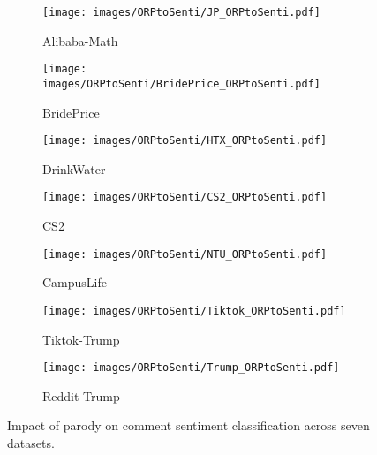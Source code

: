 \begin{figure}[htbp]
  \centering
  \begin{subfigure}[b]{0.23\textwidth}
    \centering
    \texttt{[image: images/ORPtoSenti/JP\_ORPtoSenti.pdf]}
    \caption{Alibaba-Math}
    \label{fig:ORPtoSenti_sub1}
  \end{subfigure}
  \begin{subfigure}[b]{0.23\textwidth}
    \centering
    \texttt{[image: images/ORPtoSenti/BridePrice\_ORPtoSenti.pdf]}
    \caption{BridePrice}
    \label{fig:ORPtoSenti_sub2}
  \end{subfigure}

  \vspace{0.7cm}
  
  \begin{subfigure}[b]{0.23\textwidth}
    \centering
    \texttt{[image: images/ORPtoSenti/HTX\_ORPtoSenti.pdf]}
    \caption{DrinkWater}
    \label{fig:ORPtoSenti_sub3}
  \end{subfigure} 
  \begin{subfigure}[b]{0.23\textwidth}
    \centering
    \texttt{[image: images/ORPtoSenti/CS2\_ORPtoSenti.pdf]}
    \caption{CS2}
    \label{fig:ORPtoSenti_sub4}
  \end{subfigure}

  \vspace{0.7cm}

  \begin{subfigure}[b]{0.23\textwidth}
    \centering
    \texttt{[image: images/ORPtoSenti/NTU\_ORPtoSenti.pdf]}
    \caption{CampusLife}
    \label{fig:ORPtoSenti_sub5}
  \end{subfigure}
  \begin{subfigure}[b]{0.23\textwidth}
    \centering
    \texttt{[image: images/ORPtoSenti/Tiktok\_ORPtoSenti.pdf]}
    \caption{Tiktok-Trump}
    \label{fig:ORPtoSentit_sub6}
  \end{subfigure}

  \vspace{0.7cm}

  \begin{subfigure}[b]{0.23\textwidth}
    \centering
    \texttt{[image: images/ORPtoSenti/Trump\_ORPtoSenti.pdf]}
    \caption{Reddit-Trump}
    \label{fig:ORPtoSenti_sub7}
  \end{subfigure}

  \vspace{0.7cm}  %

  \caption{Impact of parody on comment sentiment classification across seven datasets.}
  \label{fig:apd_impact_parody}
\end{figure}